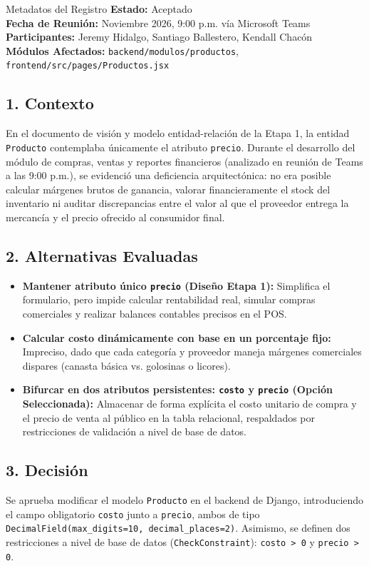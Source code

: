 \documentclass[11pt,a4paper]{article}
\begin{document}
\begin{adrbox}{Metadatos del Registro}
\textbf{Estado:} Aceptado \\
\textbf{Fecha de Reunión:} Noviembre 2026, 9:00 p.m. vía Microsoft Teams \\
\textbf{Participantes:} Jeremy Hidalgo, Santiago Ballestero, Kendall Chacón \\
\textbf{Módulos Afectados:} \texttt{backend/modulos/productos}, \texttt{frontend/src/pages/Productos.jsx}
\end{adrbox}

\subsection{1. Contexto}
En el documento de visión y modelo entidad-relación de la Etapa 1, la entidad \texttt{Producto} contemplaba únicamente el atributo \texttt{precio}. Durante el desarrollo del módulo de compras, ventas y reportes financieros (analizado en reunión de Teams a las 9:00 p.m.), se evidenció una deficiencia arquitectónica: no era posible calcular márgenes brutos de ganancia, valorar financieramente el stock del inventario ni auditar discrepancias entre el valor al que el proveedor entrega la mercancía y el precio ofrecido al consumidor final.

\subsection{2. Alternativas Evaluadas}
\begin{itemize}[leftmargin=*]
    \item \textbf{Mantener atributo único \texttt{precio} (Diseño Etapa 1):} Simplifica el formulario, pero impide calcular rentabilidad real, simular compras comerciales y realizar balances contables precisos en el POS.
    \item \textbf{Calcular costo dinámicamente con base en un porcentaje fijo:} Impreciso, dado que cada categoría y proveedor maneja márgenes comerciales dispares (canasta básica vs. golosinas o licores).
    \item \textbf{Bifurcar en dos atributos persistentes: \texttt{costo} y \texttt{precio} (Opción Seleccionada):} Almacenar de forma explícita el costo unitario de compra y el precio de venta al público en la tabla relacional, respaldados por restricciones de validación a nivel de base de datos.
\end{itemize}

\subsection{3. Decisión}
Se aprueba modificar el modelo \texttt{Producto} en el backend de Django, introduciendo el campo obligatorio \texttt{costo} junto a \texttt{precio}, ambos de tipo \texttt{DecimalField(max\_digits=10, decimal\_places=2)}. Asimismo, se definen dos restricciones a nivel de base de datos (\texttt{CheckConstraint}): \texttt{costo > 0} y \texttt{precio > 0}.
\end{document}
